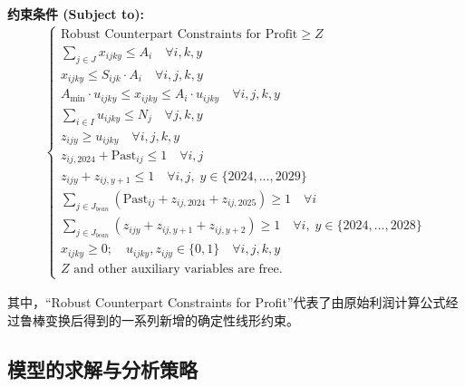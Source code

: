\documentclass[withoutpreface,bwprint]{cumcmthesis} %
\begin{document}
\textbf{约束条件 (Subject to):}
\begin{align}
\left\{
\begin{array}{l}
     \text{Robust Counterpart Constraints for Profit} \ge Z                                                                  \\
     \sum_{j \in J} x_{ijky} \le A_i                                            \quad \forall i,k,y                           \\
     x_{ijky} \le S_{ijk} \cdot A_i                                             \quad \forall i,j,k,y                         \\
     A_{\min} \cdot u_{ijky} \le x_{ijky} \le A_i \cdot u_{ijky}                \quad \forall i,j,k,y                         \\
     \sum_{i \in I} u_{ijky} \le N_j                                            \quad \forall j,k,y                           \\
     z_{ijy} \ge u_{ijky}                                                       \quad \forall i,j,k,y                         \\
     z_{ij,2024} + \text{Past}_{ij} \le 1                                       \quad \forall i,j                             \\
     z_{ijy} + z_{ij,y+1} \le 1                                                 \quad \forall i,j, \; y \in \{2024,...,2029\} \\
     \sum_{j \in J_{bean}} (\text{Past}_{ij} + z_{ij,2024} + z_{ij,2025}) \ge 1 \quad \forall i                               \\
     \sum_{j \in J_{bean}} (z_{ijy} + z_{ij,y+1} + z_{ij,y+2}) \ge 1            \quad \forall i, \; y \in \{2024,...,2028\}   \\
     x_{ijky} \ge 0; \quad u_{ijky}, z_{ijy} \in \{0, 1\}                       \quad \forall i,j,k,y                         \\
     Z \text{ and other auxiliary variables are free.}
\end{array}
\right.
\end{align}

其中，“Robust Counterpart Constraints for Profit”代表了由原始利润计算公式经过鲁棒变换后得到的一系列新增的确定性线形约束。

\subsection{模型的求解与分析策略}
\end{document}
